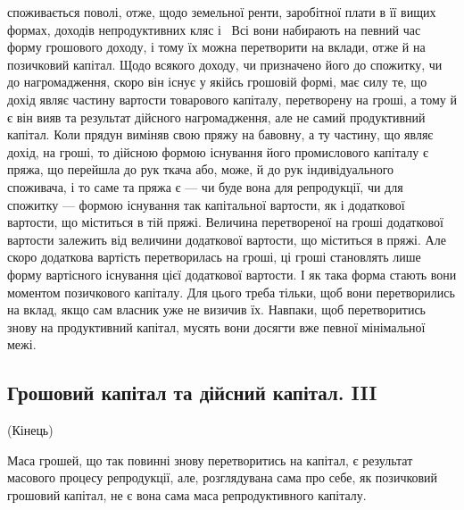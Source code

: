 \parcont{}  %
споживається поволі, отже, щодо земельної ренти, заробітної плати в її вищих
формах, доходів непродуктивних кляс і~ Всі вони набирають на певний
час форму грошового доходу, і тому їх можна перетворити на вклади, отже
й на позичковий капітал. Щодо всякого доходу, чи призначено його до спожитку,
чи до нагромадження, скоро він існує у якійсь грошовій формі, має
силу те, що дохід являє частину вартости товарового капіталу, перетворену на
гроші, а тому й є він вияв та результат дійсного нагромадження, але не самий
продуктивний капітал. Коли прядун виміняв свою пряжу на бавовну, а ту частину,
що являє дохід, на гроші, то дійсною формою існування його промислового
капіталу є пряжа, що перейшла до рук ткача або, може, й до рук індивідуального
споживача, і то саме та пряжа є — чи буде вона для репродукції, чи
для спожитку — формою існування так капітальної вартости, як і додаткової
вартости, що міститься в тій пряжі. Величина перетвореної на гроші додаткової
вартости залежить від величини додаткової вартости, що міститься в пряжі.
Але скоро додаткова вартість перетворилась на гроші, ці гроші становлять лише
форму вартісного існування цієї додаткової вартости. І як така форма стають
вони моментом позичкового капіталу. Для цього треба тільки, щоб вони перетворились
на вклад, якщо сам власник уже не визичив їх. Навпаки, щоб
перетворитись знову на продуктивний капітал, мусять вони досягти вже певної
мінімальної межі.

\subsection{Грошовий капітал та дійсний капітал. III}

(Кінець)

Маса грошей, що так повинні знову перетворитись на капітал, є результат
масового процесу репродукції, але, розглядувана сама про себе, як позичковий
грошовий капітал, не є вона сама маса репродуктивного капіталу.

